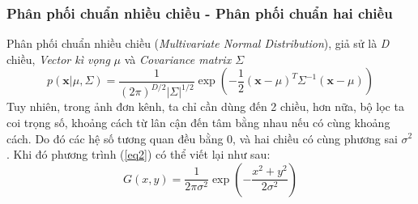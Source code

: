 \documentclass{article}
\begin{document}
    \subsubsection*{Phân phối chuẩn nhiều chiều - Phân phối chuẩn hai chiều}
    Phân phối chuẩn nhiều chiều (\textit{Multivariate Normal Distribution}), giả sử là \textit{D} chiều, \textit{Vector kì vọng} \textbf{$\mu$} và \textit{Covariance matrix $\Sigma$}
    \begin{equation}
        p(\textbf{x}|\textbf{$\mu$}, \textbf{$\Sigma$}) = \frac{1}{(2\pi)^{D/2} {|\textbf{$\Sigma$}|^{1/2}}} \exp{ \left( - \frac{1}{2} \left( \textbf{x} - \textbf{$\mu$} \right)^{T} {\textbf{$\Sigma$}}^{-1} \left( \textbf{x} - \textbf{$\mu$} \right) \right) }
        \label{eq2}
    \end{equation}
    Tuy nhiên, trong ảnh đơn kênh, ta chỉ cần dùng đến 2 chiều, hơn nữa, bộ lọc ta coi trọng số, khoảng cách từ lân cận đến tâm bằng nhau nếu có cùng khoảng cách. Do đó các hệ số tương quan đều bằng 0, và hai chiều có cùng phương sai ${\sigma}^{2}$. Khi đó phương trình (\ref{eq2}) có thể viết lại như sau:
    \begin{equation}
        G(x,y) = \frac{1}{2\pi{\sigma}^{2}} \exp{ \left(- \frac{x^2+y^2}{2{\sigma}^{2}} \right) }
    \end{equation}
\end{document}
